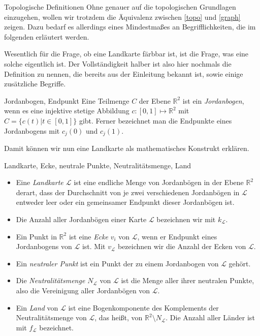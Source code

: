 \begin{section}{Topologische Definitionen}
 Ohne genauer auf die topologischen Grundlagen einzugehen, wollen wir trotzdem die Äquivalenz zwischen \ref{topo} und \ref{graph} zeigen. Dazu bedarf es allerdings eines Mindestmaßes an Begrifflichkeiten, die im folgenden erläutert werden.
 
 Wesentlich für die Frage, ob eine Landkarte färbbar ist, ist die Frage, was eine solche eigentlich ist. Der Vollständigkeit halber ist also hier nochmals die Definition zu nennen, die bereits aus der Einleitung bekannt ist, sowie einige zusätzliche Begriffe.
 
 \begin{definition}{Jordanbogen, Endpunkt}
  Eine Teilmenge $C$ der Ebene $\mathbb{R}^2$ ist ein \textit{Jordanbogen}, wenn es eine injektive stetige Abbildung $c:[0,1] \mapsto \mathbb{R}^2$ mit $C = \{c(t)|t\in [0,1]\}$ gibt. Ferner bezeichnet man die Endpunkte eines Jordanbogens mit $c_j(0)$ und $c_j(1)$.
 \end{definition}
 
 Damit können wir nun eine Landkarte als mathematisches Konstrukt erklären.
 
 \begin{definition}{Landkarte, Ecke, neutrale Punkte, Neutralitätsmenge, Land}
  \-\ 
  \begin{itemize}
    \item Eine \textit{Landkarte $\mathcal{L}$} ist eine endliche Menge von Jordanbögen in der Ebene $\mathbb{R}^2$ derart, dass der Durchschnitt von je zwei verschiedenen Jordanbögen in $\mathcal{L}$ entweder leer oder ein gemeinsamer Endpunkt dieser Jordanbögen ist.
    \item Die Anzahl aller Jordanbögen einer Karte $\mathcal{L}$ bezeichnen wir mit $k_\mathcal{L}$.
    \item Ein Punkt in $\mathbb{R}^2$ ist eine \textit{Ecke} $v_i$ von $\mathcal{L}$, wenn er Endpunkt eines Jordanbogens von $\mathcal{L}$ ist. Mit $v_\mathcal{L}$ bezeichnen wir die Anzahl der Ecken von $\mathcal{L}$.
    \item Ein \textit{neutraler Punkt} ist ein Punkt der zu einem Jordanbogen von $\mathcal{L}$ gehört.
    \item Die \textit{Neutralitätsmenge $N_{\mathcal{L}}$} von $\mathcal{L}$ ist die Menge aller ihrer neutralen Punkte, also die Vereinigung aller Jordanbögen von $\mathcal{L}$. 
    \item Ein \textit{Land} von $\mathcal{L}$ ist eine Bogenkomponente des Komplements der Neutralitätsmenge von $\mathcal{L}$, das heißt, von $\mathbb{R}^2 \setminus N_{\mathcal{L}}$. Die Anzahl aller Länder ist mit $f_\mathcal{L}$ bezeichnet.
  \end{itemize}
 \end{definition}
 

\end{section}
